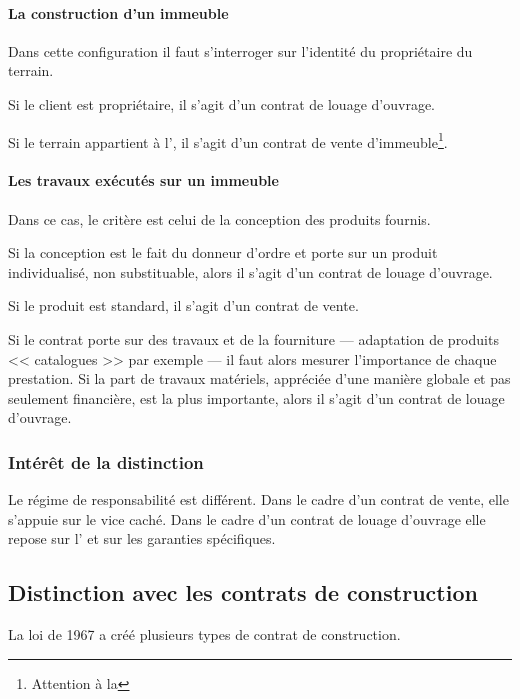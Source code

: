 				\paragraph{La construction d'un immeuble\\}

				 Dans cette configuration il faut s'interroger sur l'identité du propriétaire du terrain.

				Si le client est propriétaire, il s'agit d'un contrat de louage d'ouvrage.

				Si le terrain appartient à l'\E{}, il s'agit d'un contrat de vente d'immeuble\footnote{Attention à la \VEFA}.

				\paragraph{Les travaux exécutés sur un immeuble\\}

				Dans ce cas, le critère est celui de la conception des produits fournis.

				Si la conception est le fait du donneur d'ordre et porte sur un produit individualisé, non substituable, alors il s'agit d'un contrat de louage d'ouvrage.

				Si le produit est standard, il s'agit d'un contrat de vente.

				Si le contrat porte sur des travaux et de la fourniture --- adaptation de produits << catalogues >> par exemple --- il faut alors mesurer l'importance de chaque prestation. Si la part de travaux matériels, appréciée d'une manière globale et pas seulement financière, est la plus importante, alors il s'agit d'un contrat de louage d'ouvrage.

			\subsubsection{Intérêt de la distinction}

				Le régime de responsabilité est différent. Dans le cadre d'un contrat de vente, elle s'appuie sur le vice caché. Dans le cadre d'un contrat de louage d'ouvrage elle repose sur l' et sur les garanties spécifiques.

		\subsection{Distinction avec les contrats de construction}

			La loi de 1967 a créé plusieurs types de contrat de construction.

